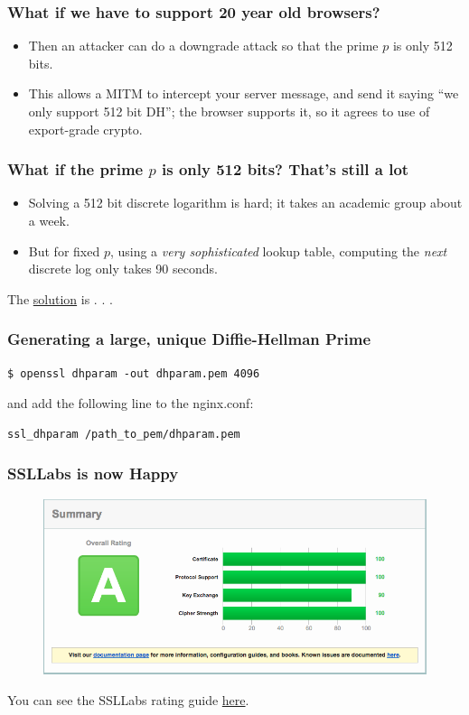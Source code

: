 \documentclass[9pt]{beamer}
\begin{document}
\begin{frame}[fragile]
\frametitle{What if we have to support 20 year old browsers?}
\begin{itemize}
\item Then an attacker can do a downgrade attack so that the prime $p$ is only 512 bits.
\pause
\item This allows a MITM to intercept your server message, and send it saying ``we only support 512 bit DH''; the browser supports it, so it agrees to use of export-grade crypto.
\end{itemize}
\end{frame}

\begin{frame}[fragile]
\frametitle{What if the prime $p$ is only 512 bits? That's still a lot}
\begin{itemize}
\item Solving a 512 bit discrete logarithm is hard; it takes an academic group about a week.
\pause
\item But for fixed $p$, using a \emph{very sophisticated} lookup table, computing the \emph{next} discrete log only takes 90 seconds.
\pause
\end{itemize}
The \href{https://weakdh.org/sysadmin.html}{solution} is . . .
\end{frame}

\begin{frame}[fragile]
\frametitle{Generating a large, unique Diffie-Hellman Prime}
\begin{verbatim}
$ openssl dhparam -out dhparam.pem 4096
\end{verbatim}
and add the following line to the nginx.conf:
\begin{verbatim}
ssl_dhparam /path_to_pem/dhparam.pem
\end{verbatim}
\end{frame}

\begin{frame}[fragile]
\frametitle{SSLLabs is now Happy}
\begin{figure}
\includegraphics[scale=0.25]{figures/SSLLabsA.png}
\end{figure}
You can see the SSLLabs rating guide \href{https://www.ssllabs.com/downloads/SSL_Server_Rating_Guide.pdf}{here}.
\end{frame}
\end{document}
